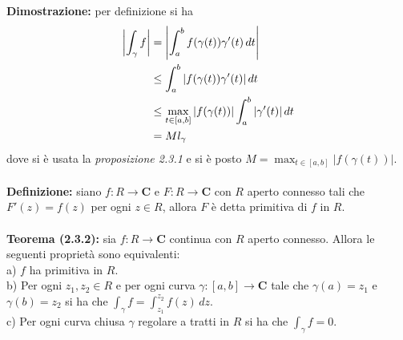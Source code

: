 \documentclass{article}
\begin{document}
\textbf{Dimostrazione:} per definizione si ha
\begin{align}
    \left|\int_\gamma f\right| &= \left|\int_a^b f(\gamma(t))\gamma'(t) \, dt\right| \notag \\
    &\leq \int_a^b |f(\gamma(t))\gamma'(t)| \, dt \notag \\
    &\leq \max_{t \in [a, b]}|f(\gamma(t))|\int_a^b |\gamma'(t)| \, dt \notag \\
    &= Ml_\gamma \notag
\end{align}
dove si è usata la \textit{proposizione 2.3.1} e si è posto $M = \max_{t \in [a, b]}|f(\gamma(t))|$. \\ \\
\textbf{Definizione:} siano $f : R \longrightarrow \mathbf{C}$ e $F : R \longrightarrow \mathbf{C}$ con $R$ aperto connesso tali che $F'(z) = f(z)$ per ogni $z \in R$, allora $F$ è detta primitiva di $f$ in $R$. \\ \\
\textbf{Teorema (2.3.2):} sia $f : R \longrightarrow \mathbf{C}$ continua con $R$ aperto connesso. Allora le seguenti proprietà sono equivalenti: \\
a) $f$ ha primitiva in $R$. \\
b) Per ogni $z_1, z_2 \in R$ e per ogni curva $\gamma : [a, b] \longrightarrow \mathbf{C}$ tale che $\gamma(a) = z_1$ e $\gamma(b) = z_2$ si ha che $\int_\gamma f = \int_{z_1}^{z_2} f(z) \, dz$. \\
c) Per ogni curva chiusa $\gamma$ regolare a tratti in $R$ si ha che $\int_\gamma f = 0$. \\
\end{document}
